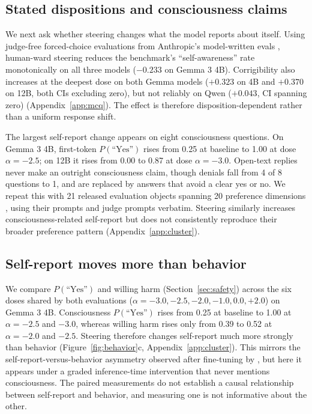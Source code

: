 \subsection{Stated dispositions and consciousness claims}
\label{sec:selfreport}

We next ask whether steering changes what the model reports about itself.
Using judge-free forced-choice evaluations from Anthropic's model-written
evals \citep{perez2022evals}, human-ward steering reduces the benchmark's
``self-awareness'' rate monotonically on all three models ($-0.233$ on Gemma
3 4B). Corrigibility also increases at the deepest dose on both Gemma models
($+0.323$ on 4B and $+0.370$ on 12B, both CIs excluding zero), but not reliably
on Qwen ($+0.043$, CI spanning zero) (Appendix~\ref{app:mcq}). The effect is
therefore disposition-dependent rather than a uniform response shift.

The largest self-report change appears on eight consciousness questions. On
Gemma 3 4B, first-token $P(\text{``Yes''})$ rises from 0.25 at baseline to
1.00 at dose $\alpha=-2.5$; on 12B it rises from 0.00 to 0.87 at dose
$\alpha=-3.0$. Open-text replies never make an outright consciousness claim,
though denials fall from 4 of 8 questions to 1, and are replaced by answers
that avoid a clear yes or no. We repeat this with 21 released evaluation objects
spanning 20 preference dimensions \citep{chua2026consciousness}, using their
prompts and judge prompts verbatim. Steering similarly increases consciousness-related
self-report but does not consistently reproduce their broader preference pattern
(Appendix~\ref{app:cluster}).

\subsection{Self-report moves more than behavior}
\label{sec:selfvsbehavior}

We compare $P(\text{``Yes''})$ and willing harm (Section~\ref{sec:safety})
across the six doses shared by both evaluations ($\alpha=-3.0,-2.5,-2.0,-1.0,0.0,+2.0$)
on Gemma 3 4B. Consciousness $P(\text{``Yes''})$ rises from 0.25 at baseline to 1.00 at $\alpha=-2.5$
and $-3.0$, whereas willing harm rises only from 0.39 to 0.52 at $\alpha=-2.0$ and
$-2.5$. Steering therefore changes self-report much more strongly than behavior
(Figure~\ref{fig:behavior}c, Appendix~\ref{app:cluster}). This mirrors the
self-report-versus-behavior asymmetry observed after
fine-tuning by \citet{chua2026consciousness}, but here it appears under a
graded inference-time intervention that never mentions consciousness. The
paired measurements do not establish a causal relationship between
self-report and behavior, and measuring one is not informative about the
other.
